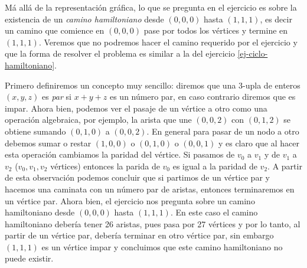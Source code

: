 \documentclass[a4paper,12pt,twoside,spanish,reqno]{amsbook}
\numberwithin{equation}{section}
\begin{document}
\begin{enumerate}
\begin{center}
         
     \end{center}
     Má allá de la representación gráfica, lo que se pregunta en el ejercicio es sobre la existencia de un \textit{camino hamiltoniano} desde $(0,0,0)$ hasta $(1,1,1)$, es decir un camino  que comience en $(0,0,0)$ pase por todos los vértices y  termine en $(1,1,1)$. Veremos que no podremos hacer el camino requerido por el ejercicio y que la forma de resolver el problema es similar a la del ejercicio \ref{ej-ciclo-hamiltoniano}.    
     
     Primero definiremos un concepto muy sencillo: diremos  que una 3-upla de enteros $(x,y,z)$ es  \textit{par} si $x+y+z$ es un número par, en caso contrario diremos que es impar. 
     Ahora bien, podemos ver el pasaje de un vértice a otro como una operación algebraica, por ejemplo, la arista que une $(0,0,2)$ con $(0,1,2)$ se obtiene sumando $(0,1,0)$ a $(0,0,2)$.  En general  para pasar de un nodo a otro debemos sumar o restar  $(1,0,0)$ o $(0,1,0)$ o $(0,0,1)$ y es claro que al hacer esta operación cambiamos la paridad del vértice. Si pasamos de $v_0$ a $v_1$ y de $v_1$ a $v_2$ ($v_0,v_1,v_2$ vértices) entonces la parida de $v_0$ es igual a la paridad de $v_2$.  A partir de esta observación podemos concluir que si partimos de un vértice par y hacemos una caminata con un número par de aristas,  entonces terminaremos en un vértice par. Ahora bien, el  ejercicio nos pregunta sobre un camino hamiltoniano desde $(0,0,0)$ hasta $(1,1,1)$. En este caso el camino hamiltoniano debería tener 26 aristas, pues pasa por 27 vértices y por lo tanto,  al partir de un vértice par,  debería terminar  en otro vértice par, sin embargo $(1,1,1)$ es un vértice impar y concluimos que  este camino hamiltoniano  no  puede existir.  
 

\end{enumerate}
\end{document}
